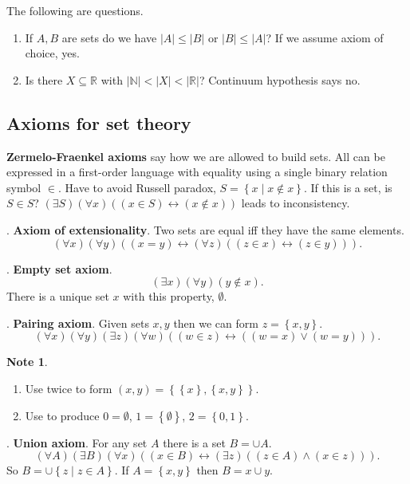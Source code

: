 \documentclass{article}
\newcommand{\N}{\mathbb{N}}
\newcommand{\R}{\mathbb{R}}
\newcommand{\rb}[1]{\left( #1 \right)}
\newcommand{\cb}[1]{\left\{ #1 \right\}}
\newcommand{\abs}[1]{\left\lvert #1 \right\rvert}
\newcommand{\orb}[2]{\rb{#1 \lor #2}}
\newcommand{\andb}[2]{\rb{#1 \land #2}}
\newcommand{\iffb}[2]{\rb{#1 \leftrightarrow #2}}
\newcommand{\fab}[1]{\rb{\forall #1}}
\newcommand{\teb}[1]{\rb{\exists #1}}
\newcommand{\eqb}[2]{\rb{#1 = #2}}
\newcommand{\inb}[2]{\rb{#1 \in #2}}
\newcommand{\nib}[2]{\rb{#1 \notin #2}}
\theoremstyle{definition}\newtheorem{definition}{Definition}[subsection]
\theoremstyle{definition}\newtheorem{remark}[definition]{Remark}
\theoremstyle{definition}\newtheorem*{example}{Example}
\theoremstyle{definition}\newtheorem*{note}{Note}
\begin{document}
The following are questions.
\begin{enumerate}
\item If $ A, B $ are sets do we have $ \abs{A} \le \abs{B} $ or $ \abs{B} \le \abs{A} $? If we assume axiom of choice, yes.
\item Is there $ X \subseteq \R $ with $ \abs{\N} < \abs{X} < \abs{\R} $? Continuum hypothesis says no.
\end{enumerate}

\subsection{Axioms for set theory}

\textbf{Zermelo-Fraenkel axioms} say how we are allowed to build sets. All can be expressed in a first-order language with equality using a single binary relation symbol $ \in $. Have to avoid Russell paradox, $ S = \cb{x \mid x \notin x} $. If this is a set, is $ S \in S $? $ \teb{S}\fab{x}\iffb{\inb{x}{S}}{\nib{x}{x}} $ leads to inconsistency.

. \textbf{Axiom of extensionality}. Two sets are equal iff they have the same elements.
$$ \fab{x}\fab{y}\iffb{\eqb{x}{y}}{\fab{z}\iffb{\inb{z}{x}}{\inb{z}{y}}}. $$

. \textbf{Empty set axiom}.
$$ \teb{x}\fab{y}\nib{y}{x}. $$
There is a unique set $ x $ with this property, $ \emptyset $.


. \textbf{Pairing axiom}. Given sets $ x, y $ then we can form $ z = \cb{x, y} $.
$$ \fab{x}\fab{y}\teb{z}\fab{w}\iffb{\inb{w}{z}}{\orb{\eqb{w}{x}}{\eqb{w}{y}}}. $$

\begin{note}
\hfill
\begin{enumerate}
\item Use twice to form $ \rb{x, y} = \cb{\cb{x}, \cb{x, y}} $.
\item Use to produce $ 0 = \emptyset $, $ 1 = \cb{\emptyset} $, $ 2 = \cb{0, 1} $.
\end{enumerate}
\end{note}

. \textbf{Union axiom}. For any set $ A $ there is a set $ B = \cup A $.
$$ \fab{A}\teb{B}\fab{x}\iffb{\inb{x}{B}}{\teb{z}\andb{\inb{z}{A}}{\inb{x}{z}}}. $$
So $ B = \cup \cb{z \mid z \in A} $. If $ A = \cb{x, y} $ then $ B = x \cup y $.
\end{document}
